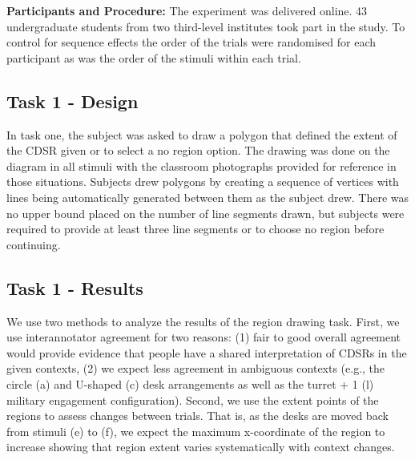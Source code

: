 \documentclass[11pt,letterpaper]{article}
\begin{document}
\textbf{Participants and Procedure:} The experiment was delivered online. 43 undergraduate students from two third-level institutes took part in the study. To control for sequence effects the order of the trials were randomised for each participant as was the order of the stimuli within each trial.   

\subsection{Task 1 - Design}
In task one, the subject was asked to draw a polygon that defined the extent of the CDSR given or to select a no region option.  The drawing was done on the diagram in all stimuli with the classroom photographs provided for reference in those situations.  Subjects drew polygons by creating a sequence of vertices with lines being automatically generated between them as the subject drew.  There was no upper bound placed on the number of line segments drawn, but subjects were required to provide at least three line segments or to choose no region before continuing.

\subsection{Task 1 - Results}
We use two methods to analyze the results of the region drawing task.  First, we use interannotator agreement for two reasons: (1) fair to good overall agreement would provide evidence that people have a shared interpretation of CDSRs in the given contexts, (2) we expect less agreement in ambiguous contexts (e.g., the circle (a) and U-shaped (c) desk arrangements as well as the turret + 1 (l) military engagement configuration).  Second, we use the extent points of the regions to assess changes between trials.  That is, as the desks are moved back from stimuli (e) to (f), we expect the maximum x-coordinate of the region to increase showing that region extent varies systematically with context changes.

\end{document}
